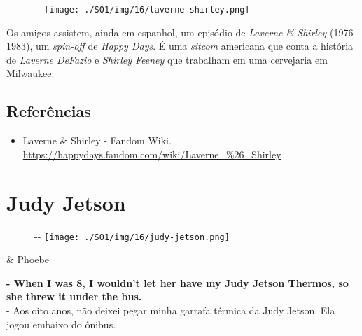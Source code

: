 \begin{figure}[!ht]
  \begin{adjustwidth}{-\oddsidemargin-1in}{-\rightmargin}
    \centering
    \texttt{[image: ./S01/img/16/laverne-shirley.png]}
  \end{adjustwidth}
\end{figure}

Os amigos assistem, ainda em espanhol, um episódio de \emph{Laverne \&
Shirley} (1976-1983), um \emph{spin-off} de \emph{Happy Days}. É uma
\emph{sitcom} americana que conta a história de \emph{Laverne DeFazio} e
\emph{Shirley Feeney} que trabalham em uma cervejaria em Milwaukee.

\hypertarget{referuxeancias-5}{%
\subsection{Referências}\label{referuxeancias-5}}

\begin{itemize}
\tightlist
\item
  \sloppy Laverne \& Shirley - Fandom Wiki. \url{https://happydays.fandom.com/wiki/Laverne_%26_Shirley}
\end{itemize}

\hypertarget{judy-jetson}{%
\section{Judy Jetson}\label{judy-jetson}}

\begin{figure}[!ht]
  \begin{adjustwidth}{-\oddsidemargin-1in}{-\rightmargin}
    \centering
    \texttt{[image: ./S01/img/16/judy-jetson.png]}
  \end{adjustwidth}
\end{figure}

\begin{tcolorbox}[enhanced,center upper,
    drop fuzzy shadow southeast, boxrule=0.3pt,
    lower separated=false, breakable,
    colframe=black!30!dialogoBorder,colback=white]
\begin{minipage}[c]{0.16\linewidth}
   & \centering \scriptsize{Phoebe}
\end{minipage}
\hfill
\begin{minipage}[c]{0.8\linewidth}
  \textbf{- When I was 8, I wouldn't let her have my Judy Jetson Thermos, so she threw it under the bus.}\\
  - Aos oito anos, não deixei pegar minha garrafa térmica da Judy Jetson. Ela jogou embaixo do ônibus.
\end{minipage}
\end{tcolorbox}

